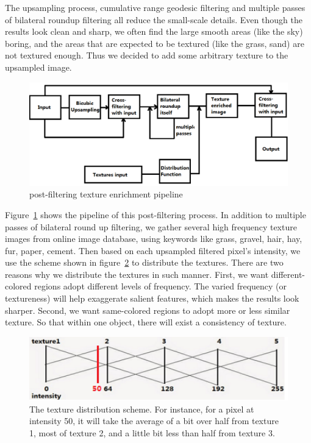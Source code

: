 The upsampling process, cumulative range geodesic filtering and multiple passes of bilateral roundup filtering all reduce the small-scale details. Even though the results look clean and sharp, we often find the large smooth areas (like the sky) boring, and the areas that are expected to be textured (like the grass, sand) are not textured enough. Thus we decided to add some arbitrary texture to the upsampled image.

\begin{figure}[htbp]
\includegraphics[width=1.0\textwidth]{f14}
\caption{post-filtering texture enrichment pipeline}
\label{fig:textureEnrich}
\end{figure}

Figure~\ref{fig:textureEnrich} shows the pipeline of this post-filtering process. In addition to multiple passes of bilateral round up filtering, we gather several high frequency texture images from online image database, using keywords like grass, gravel, hair, hay, fur, paper, cement. Then based on each upsampled filtered pixel's intensity, we use the scheme shown in figure~\ref{fig:textureDistribution} to distribute the textures. There are two reasons why we distribute the textures in such manner. First, we want different-colored regions adopt different levels of frequency. The varied frequency (or textureness) will help exaggerate salient features, which makes the results look sharper. Second, we want same-colored regions to adopt more or less similar texture. So that within one object, there will exist a consistency of texture. 

\begin{figure}[htbp]
\includegraphics[width=1.0\textwidth]{f15}
\caption{The texture distribution scheme. For instance, for a pixel at intensity 50, it will take the average of a bit over half from texture 1, most of texture 2, and a little bit less than half from texture 3.}
\label{fig:textureDistribution}
\end{figure}

